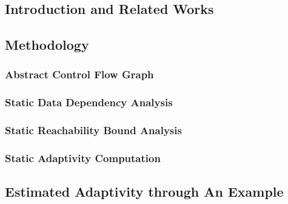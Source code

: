 \subsection{Introduction and Related Works}
\label{subsec:static-intro}


\subsection{Methodology}
\label{subsec:static-methodology}

\subsubsection{Abstract Control Flow Graph}
\label{subsubsec:static-abscfg}


\subsubsection{Static Data Dependency Analysis}
\label{subsubsec:static-datadep}


\subsubsection{Static Reachability Bound Analysis}
\label{subsubsec:static-reachability}


\subsubsection{Static Adaptivity Computation}
\label{subsubsec:static-adapt}


\subsection{Estimated Adaptivity through An Example}
\label{subsec:static-examples}

%
